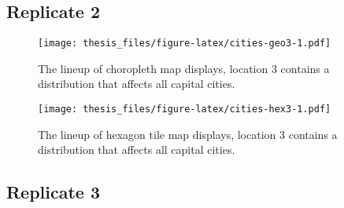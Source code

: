 \documentclass{monashthesis}
\begin{document}
\hypertarget{replicate-2}{%
\subsection{Replicate 2}\label{replicate-2}}

\begin{Shaded}
\begin{Highlighting}[]
\NormalTok{() }\OperatorTok{+}
\StringTok{  }\NormalTok{(}\NormalTok{(}\NormalTok{(}\NormalTok{)))}
\end{Highlighting}
\end{Shaded}

\begin{figure}
\centering
\texttt{[image: thesis\_files/figure-latex/cities-geo3-1.pdf]}
\caption{\label{fig:cities-geo3}The lineup of choropleth map displays, location 3 contains a distribution that affects all capital cities.}
\end{figure}

\begin{Shaded}
\begin{Highlighting}[]
\NormalTok{() }\OperatorTok{+}
\StringTok{  }\NormalTok{(}\NormalTok{(}\NormalTok{(}\NormalTok{)))}
\end{Highlighting}
\end{Shaded}

\begin{figure}
\centering
\texttt{[image: thesis\_files/figure-latex/cities-hex3-1.pdf]}
\caption{\label{fig:cities-hex3}The lineup of hexagon tile map displays, location 3 contains a distribution that affects all capital cities.}
\end{figure}

\hypertarget{replicate-3}{%
\subsection{Replicate 3}\label{replicate-3}}

\begin{Shaded}
\begin{Highlighting}[]
\NormalTok{() }\OperatorTok{+}
\StringTok{  }\NormalTok{(}\NormalTok{(}\NormalTok{(}\NormalTok{)))}
\end{Highlighting}
\end{Shaded}
\end{document}
